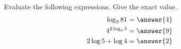 \documentclass{ximera}
\author{Nela Lakos \and Kyle Parsons}
\begin{document}
\begin{exercise}

Evaluate the following expressions.  Give the exact value.
\begin{align*}
\log_3{81} &= \answer{4}\\
4^{2\log_4{3}} &= \answer{9}\\
2\log{5} + \log{4} &= \answer{2}
\end{align*}

\end{exercise}
\end{document}
